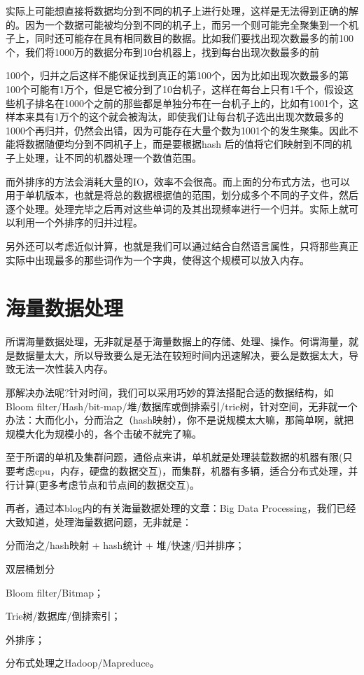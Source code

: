 实际上可能想直接将数据均分到不同的机子上进行处理，这样是无法得到正确的解的。因为一个数据可能被均分到不同的机子上，而另一个则可能完全聚集到一个机子上，同时还可能存在具有相同数目的数据。比如我们要找出现次数最多的前100个，我们将1000万的数据分布到10台机器上，找到每台出现次数最多的前
 
100个，归并之后这样不能保证找到真正的第100个，因为比如出现次数最多的第100个可能有1万个，但是它被分到了10台机子，这样在每台上只有1千个，假设这些机子排名在1000个之前的那些都是单独分布在一台机子上的，比如有1001个，这样本来具有1万个的这个就会被淘汰，即使我们让每台机子选出出现次数最多的1000个再归并，仍然会出错，因为可能存在大量个数为1001个的发生聚集。因此不能将数据随便均分到不同机子上，而是要根据hash
 后的值将它们映射到不同的机子上处理，让不同的机器处理一个数值范围。

而外排序的方法会消耗大量的IO，效率不会很高。而上面的分布式方法，也可以用于单机版本，也就是将总的数据根据值的范围，划分成多个不同的子文件，然后逐个处理。处理完毕之后再对这些单词的及其出现频率进行一个归并。实际上就可以利用一个外排序的归并过程。

另外还可以考虑近似计算，也就是我们可以通过结合自然语言属性，只将那些真正实际中出现最多的那些词作为一个字典，使得这个规模可以放入内存。

\section{海量数据处理}
所谓海量数据处理，无非就是基于海量数据上的存储、处理、操作。何谓海量，就是数据量太大，所以导致要么是无法在较短时间内迅速解决，要么是数据太大，导致无法一次性装入内存。

那解决办法呢?针对时间，我们可以采用巧妙的算法搭配合适的数据结构，如Bloom 
filter/Hash/bit-map/堆/数据库或倒排索引/trie树，针对空间，无非就一个办法：大而化小，分而治之（hash映射），你不是说规模太大嘛，那简单啊，就把规模大化为规模小的，各个击破不就完了嘛。

至于所谓的单机及集群问题，通俗点来讲，单机就是处理装载数据的机器有限(只要考虑cpu，内存，硬盘的数据交互)，而集群，机器有多辆，适合分布式处理，并行计算(更多考虑节点和节点间的数据交互)。

再者，通过本blog内的有关海量数据处理的文章：Big Data Processing，我们已经大致知道，处理海量数据问题，无非就是：

\begindot
\item 分而治之/hash映射 + hash统计 + 堆/快速/归并排序；
\item 双层桶划分
\item Bloom filter/Bitmap；
\item Trie树/数据库/倒排索引；
\item 外排序；
\item 分布式处理之Hadoop/Mapreduce。
\myenddot

